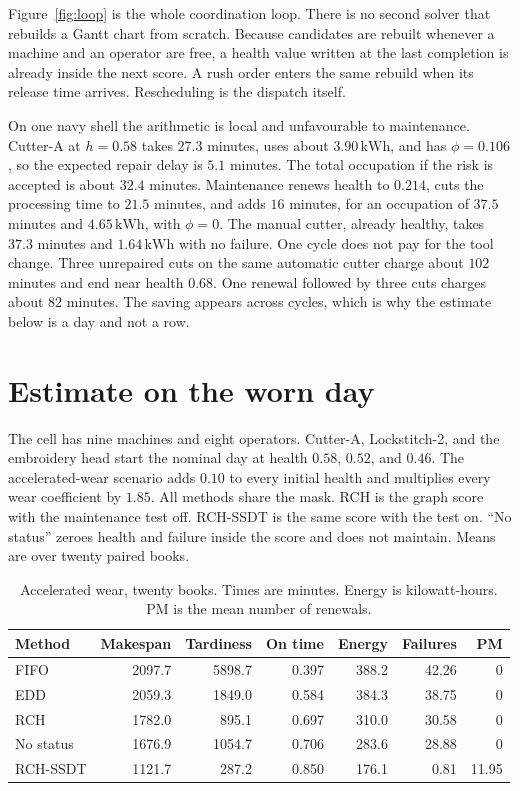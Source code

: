 \documentclass[10pt,a4paper]{article}
\begin{document}
Figure~\ref{fig:loop} is the whole coordination loop. There is no second solver that rebuilds a Gantt chart from scratch. Because candidates are rebuilt whenever a machine and an operator are free, a health value written at the last completion is already inside the next score. A rush order enters the same rebuild when its release time arrives. Rescheduling is the dispatch itself.

On one navy shell the arithmetic is local and unfavourable to maintenance. Cutter-A at \(h = 0.58\) takes \(27.3\) minutes, uses about \(3.90\,\mathrm{kWh}\), and has \(\phi = 0.106\), so the expected repair delay is \(5.1\) minutes. The total occupation if the risk is accepted is about \(32.4\) minutes. Maintenance renews health to \(0.214\), cuts the processing time to \(21.5\) minutes, and adds \(16\) minutes, for an occupation of \(37.5\) minutes and \(4.65\,\mathrm{kWh}\), with \(\phi = 0\). The manual cutter, already healthy, takes \(37.3\) minutes and \(1.64\,\mathrm{kWh}\) with no failure. One cycle does not pay for the tool change. Three unrepaired cuts on the same automatic cutter charge about \(102\) minutes and end near health \(0.68\). One renewal followed by three cuts charges about \(82\) minutes. The saving appears across cycles, which is why the estimate below is a day and not a row.

\section{Estimate on the worn day}

The cell has nine machines and eight operators. Cutter-A, Lockstitch-2, and the embroidery head start the nominal day at health \(0.58\), \(0.52\), and \(0.46\). The accelerated-wear scenario adds \(0.10\) to every initial health and multiplies every wear coefficient by \(1.85\). All methods share the mask. RCH is the graph score with the maintenance test off. RCH-SSDT is the same score with the test on. ``No status'' zeroes health and failure inside the score and does not maintain. Means are over twenty paired books.

\begin{table}[ht]
\centering
\caption{Accelerated wear, twenty books. Times are minutes. Energy is kilowatt-hours. PM is the mean number of renewals.}
\label{tab:wear}
\small
\begin{tabular}{lrrrrrr}
\toprule
Method & Makespan & Tardiness & On time & Energy & Failures & PM \\
\midrule
FIFO & 2097.7 & 5898.7 & 0.397 & 388.2 & 42.26 & 0 \\
EDD & 2059.3 & 1849.0 & 0.584 & 384.3 & 38.75 & 0 \\
RCH & 1782.0 & 895.1 & 0.697 & 310.0 & 30.58 & 0 \\
No status & 1676.9 & 1054.7 & 0.706 & 283.6 & 28.88 & 0 \\
RCH-SSDT & 1121.7 & 287.2 & 0.850 & 176.1 & 0.81 & 11.95 \\
\bottomrule
\end{tabular}
\end{table}
\end{document}
